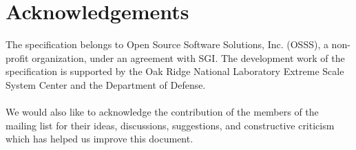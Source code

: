 \section*{Acknowledgements}
The \openshmem specification belongs to Open Source Software Solutions, Inc. (OSSS), a non-profit organization, under an agreement with SGI. The development work of the specification is supported by the Oak Ridge National Laboratory Extreme Scale System Center and the Department of Defense.\\
\\
We would also like to acknowledge the contribution of the members of the \openshmem mailing list for their ideas, discussions, suggestions, and constructive criticism which has helped us improve this document.


%
%

{\large \pagebreak{}}
